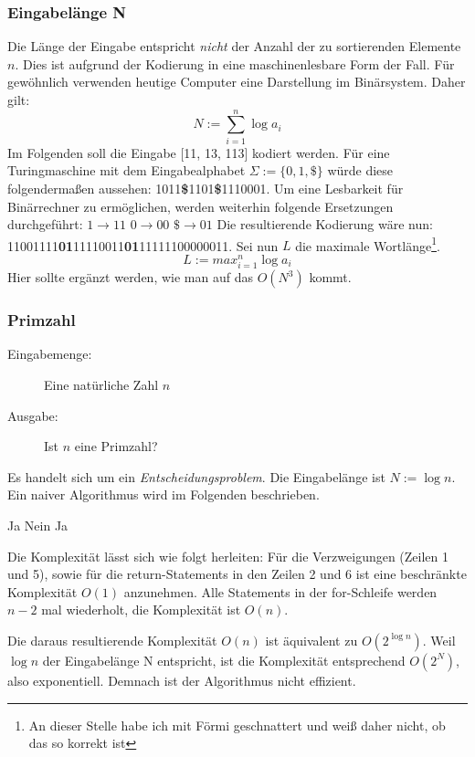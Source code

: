 \documentclass{article} %
\begin{document}
\subsubsection{Eingabelänge N}
Die Länge der Eingabe entspricht \emph{nicht} der Anzahl der zu sortierenden Elemente $n$.
Dies ist aufgrund der Kodierung in eine maschinenlesbare Form der Fall.
Für gewöhnlich verwenden heutige Computer eine Darstellung im Binärsystem. Daher gilt:
\begin{equation}
N := \sum_{i=1}^n \log a_i
\end{equation}
Im Folgenden soll die Eingabe [11, 13, 113] kodiert werden.
Für eine Turingmaschine mit dem Eingabealphabet $\Sigma := \{0,1,\$ \}$ würde diese folgendermaßen aussehen:
1011\textbf{\$}1101\textbf{\$}1110001.
Um eine Lesbarkeit für Binärrechner zu ermöglichen, werden weiterhin folgende Ersetzungen durchgeführt:
$1 \rightarrow 11$
$0 \rightarrow 00$
$\$ \rightarrow 01$
Die resultierende Kodierung wäre nun:
11001111\textbf{01}11110011\textbf{01}11111100000011.
Sei nun $L$ die maximale Wortlänge\footnote{An dieser Stelle habe ich mit Förmi geschnattert und weiß daher nicht, ob das so korrekt ist}.
\begin{equation}
L := max_{i=1}^n \log a_i
\end{equation}
Hier sollte ergänzt werden, wie man auf das $O(N^3)$ kommt.
\subsubsection{Primzahl}
\begin{description}
	\item[Eingabemenge:] Eine natürliche Zahl $n$
	\item[Ausgabe:] Ist $n$ eine Primzahl? 
\end{description}
Es handelt sich um ein \emph{Entscheidungsproblem}.
Die Eingabelänge ist $N := \log n$.
Ein naiver Algorithmus wird im Folgenden beschrieben.

\begin{algorithmic}[1]
	 \State \Return Ja
	\Else {}
			\State \Return Nein
		\Else
		\EndIf
	\EndFor
	\State \Return Ja
	\EndIf
\end{algorithmic}

Die Komplexität lässt sich wie folgt herleiten:
Für die Verzweigungen (Zeilen 1 und 5), sowie für die return-Statements in den Zeilen 2 und 6 ist eine beschränkte Komplexität $O(1)$ anzunehmen.
Alle Statements in der for-Schleife werden $n-2$ mal wiederholt, die Komplexität ist $O(n)$.

Die daraus resultierende Komplexität $O(n)$ ist äquivalent zu $O(2^{\log n})$.
Weil $\log n$ der Eingabelänge N entspricht, ist die Komplexität entsprechend $O(2^N)$, also exponentiell.
Demnach ist der Algorithmus nicht effizient.
\end{document}
